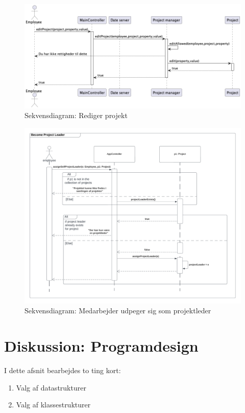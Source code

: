 \begin{figure}[H]
    \centering
    \caption{Sekvensdiagram: Rediger projekt}\label{fig:sequence_project_edit}
    \includegraphics[width = .75\textwidth]{Diagrams/seq_project_edit.png}
\end{figure}
\begin{figure}[H]
    \centering
    \caption{Sekvensdiagram: Medarbejder udpeger sig som projektleder}\label{fig:becomeProjectLeader}
    \includegraphics[width = 1\textwidth]{Diagrams/Become Project Leader.png}
\end{figure}
\newpage
\section{Diskussion: Programdesign}
I dette afsnit bearbejdes to ting kort:
\begin{enumerate}
    \item Valg af datastrukturer
    \item Valg af klassestrukturer
\end{enumerate}
